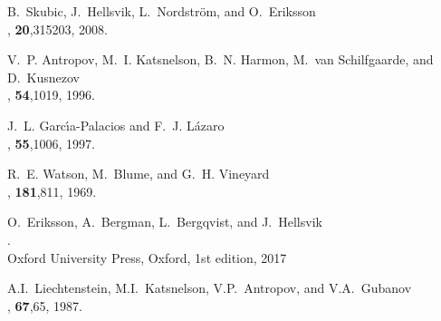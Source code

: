 \documentclass[11pt,fleqn,a4]{book} %
\begin{document}
\begin{thebibliography}{1}

B.~Skubic, J.~Hellsvik, L.~Nordstr{\"o}m, and O.~Eriksson\\
, \textbf{20},315203, 2008.

V.~P. Antropov, M.~I. Katsnelson, B.~N. Harmon, M.~van Schilfgaarde, and
  D.~Kusnezov \\
, \textbf{54},1019, 1996.

J.~L. Garc\'\i{}a-Palacios and F.~J. L\'azaro\\
, \textbf{ 55},1006, 1997.

R.~E. Watson, M.~Blume, and G.~H. Vineyard\\
, \textbf{ 181},811, 1969.

O.~Eriksson, A.~Bergman, L.~Bergqvist, and J.~Hellsvik\\
.\\
\newblock Oxford University Press, Oxford, 1st edition, 2017

A.I.~Liechtenstein, M.I.~Katsnelson, V.P.~Antropov,  and V.A.~Gubanov\\
, \textbf{ 67},65, 1987.


\end{thebibliography}
\end{document}
